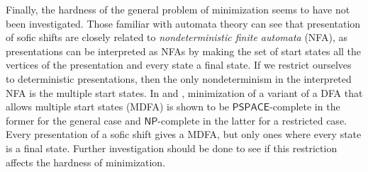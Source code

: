 \documentclass[hidelinks]{report}
\newcommand{\term}[1]{\textit{#1}}
\theoremstyle{definition}
\begin{document}
Finally, the hardness of the general problem of minimization seems 
to have not been investigated. Those familiar with 
automata theory can see that presentation of sofic shifts 
are closely related to \term{nondeterministic finite automata} (NFA),
as presentations can be interpreted as NFAs
by making the set of start states 
all the vertices of the presentation and 
every state a final state. If we restrict 
ourselves to deterministic presentations, then the only 
nondeterminism in the interpreted NFA is the multiple start states. 
In \cite{holzer2001state} and \cite{malcher2004minimizing}, 
minimization of a variant of a DFA 
that allows multiple start states (MDFA) is shown to be 
\(\mathsf{PSPACE}\)-complete in the former for the general case and
 \(\mathsf{NP}\)-complete in the latter for a restricted case.
Every presentation of a sofic shift gives a MDFA, but only ones
where every state is a final state. Further investigation should 
be done to see if this restriction affects the hardness of minimization.

\printbibliography
\end{document}

